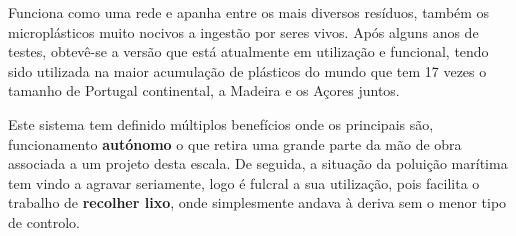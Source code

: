 \documentclass[letterpaper,12pt]{article}
\begin{document}
\par Funciona como uma rede e apanha entre os mais diversos resíduos, também os microplásticos muito nocivos a ingestão por seres vivos. Após alguns anos de testes, obtevê-se a versão que está atualmente em utilização e funcional, tendo sido utilizada na maior acumulação de plásticos do mundo que tem 17 vezes o tamanho de Portugal continental, a Madeira e os Açores juntos.
\par Este sistema tem definido múltiplos benefícios onde os principais são, funcionamento {\bf autónomo} o que retira uma grande parte da mão de obra associada a um projeto desta escala. De seguida, a situação da poluição marítima tem vindo a agravar seriamente, logo é fulcral a sua utilização, pois facilita o trabalho de {\bf recolher lixo}, onde simplesmente andava à deriva sem o menor tipo de controlo.

\newpage
\end{document}
